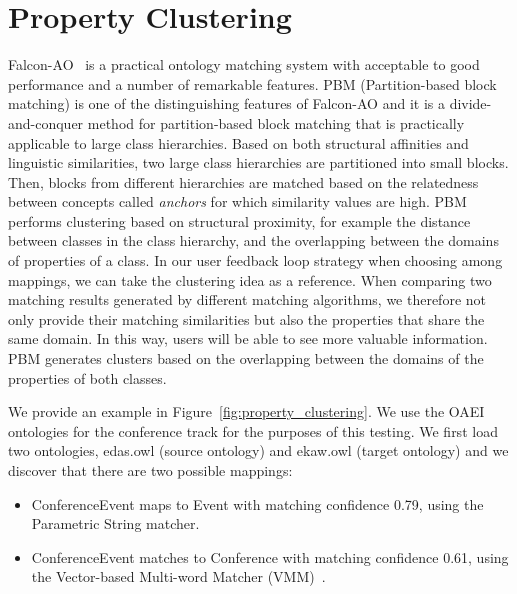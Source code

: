 \section{Property Clustering} %
\label{sub:property_clustering}
Falcon-AO~\cite{hu2008falcon} is a practical ontology matching system
with acceptable to good performance and a number of remarkable
features. PBM (Partition-based block matching) is one of the
distinguishing features of Falcon-AO and it is a divide-and-conquer
method for partition-based block matching that is practically
applicable to large class hierarchies. Based on both structural
affinities and linguistic similarities, two large class hierarchies
are partitioned into small blocks. Then, blocks from different
hierarchies are matched based on the relatedness between concepts
called {\it anchors\/} for which similarity values are high. PBM
performs clustering based on structural proximity, for example the
distance between classes in the class hierarchy, and the overlapping
between the domains of properties of a class. In our user feedback
loop strategy when choosing among mappings, we can take the clustering
idea as a reference. When comparing two matching results generated by
different matching algorithms, we therefore not only provide their
matching similarities but also the properties that share the same
domain. In this way, users will be able to see more valuable
information. PBM generates clusters based on the overlapping between
the domains of the properties of both classes. %

We provide an example in Figure~\ref{fig:property_clustering}. We use
the OAEI ontologies for the conference track for the purposes of this
testing. We first load two ontologies, edas.owl (source ontology) and
ekaw.owl (target ontology) and we discover that there are two possible
mappings: 
\begin{itemize}
\item ConferenceEvent maps to Event with matching confidence 0.79,
  using the Parametric String matcher. 
\item ConferenceEvent matches to Conference with matching confidence
  0.61, using the Vector-based Multi-word Matcher (VMM)~\cite{cruz-oaei-2009}.
\end{itemize}

